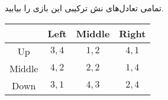 تمامی تعادل‌های نش ترکیبی این بازی را بیابید.
\vspace{10pt}

\LTR 
\begin{latin}
    \begin{center}
        \begin{tabular}{c | c c c}
                    & Left    & Middle    & Right \\ \hline
            Up      & $3,4$   & $1,2$     & $4,1$ \\
            Middle  & $4,2$   & $2,2$     & $1,4$ \\
            Down    & $3,1$   & $4,3$     & $2,4$ \\
        \end{tabular}
    \end{center}
\end{latin}
\RTL